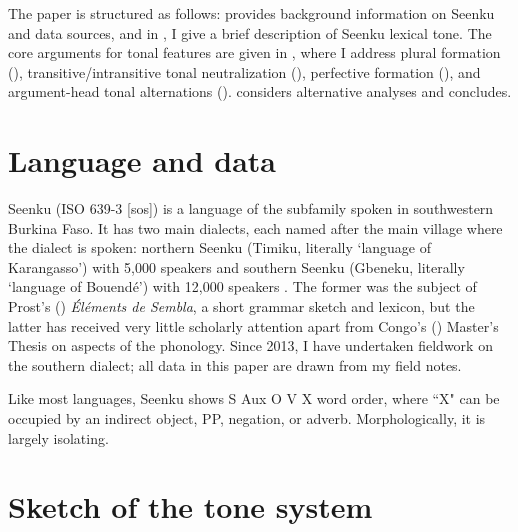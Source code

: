 \documentclass[output=paper]{langsci/langscibook}
\begin{document}
The paper is structured as follows:  provides background information on Seenku and data sources, and in , I give a brief description of Seenku lexical tone. The core arguments for tonal features are given in , where I address plural formation (), transitive/intransitive tonal neutralization (), perfective formation (), and argument-head tonal alternations ().  considers alternative analyses and  concludes.





\section{Language and data}\label{sec:mcpherson:SecBackground} 
Seenku (ISO 639-3 [sos]) is a  language of the  subfamily spoken in southwestern Burkina Faso. It has two main dialects, each named after the main village where the dialect is spoken: northern Seenku (Timiku, literally `language of Karangasso') with 5,000 speakers and southern Seenku (Gbeneku, literally `language of Bouend\'e') with 12,000 speakers \citep{Ethnologue}. The former was the subject of Prost's (\citeyear{Prost71}) {\it \'El\'ements de Sembla}, a short grammar sketch and lexicon, but the latter has received very little scholarly attention apart from Congo's (\citeyear{Congo13}) Master's Thesis on aspects of the phonology. Since 2013, I have undertaken fieldwork on the southern dialect; all data in this paper are drawn from my field notes.

  
Like most  languages, Seenku shows S Aux O V X word order, where ``X" can be occupied by an indirect object, PP, negation, or adverb. Morphologically, it is largely isolating.

\section{Sketch of the tone system}\label{sec:mcpherson:SecTone}
\end{document}
